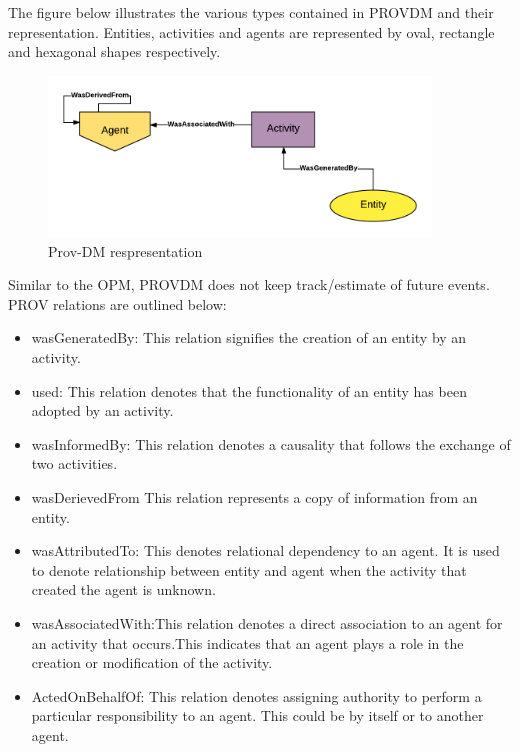 The figure below illustrates the various types contained in PROV\-DM and their representation. Entities, activities and agents are represented by oval, rectangle and hexagonal shapes respectively.

\begin{figure}[h]
\begin{center}

\includegraphics[width=4.0in]{prov_dm_1.PNG}
\end{center}
\caption{Prov-DM respresentation }
\end{figure}

Similar to the OPM, PROV\-DM does not keep track/estimate of future events. PROV relations are outlined below:


\begin{itemize}
\item wasGeneratedBy: This relation signifies the creation of an entity by an activity. 

\item used: This relation denotes that the functionality of an entity has been adopted by an activity.

\item wasInformedBy: This relation denotes a causality that follows the exchange of two activities.

\item wasDerievedFrom This relation represents a copy of information from an entity. 

\item wasAttributedTo: This denotes relational dependency to an agent. It is used to denote relationship between entity and agent when the activity that created the agent is unknown.

\item wasAssociatedWith:This relation denotes a direct association to an agent for an activity that occurs.This indicates that an agent plays a role in the creation or modification of the activity.

\item ActedOnBehalfOf: This relation denotes assigning authority to perform a particular responsibility to an agent. This could be by itself or to another agent.



\end{itemize}


